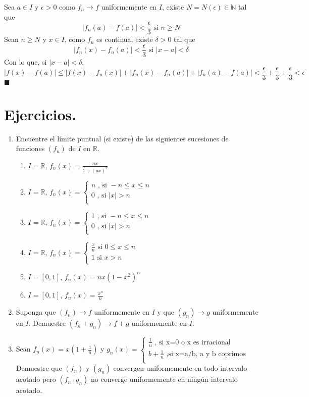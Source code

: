 \documentclass[12pt]{book}
\newcommand\R{{\mathbb R}}
\newcommand\N{{\mathbb N}}
\providecommand{\abs}[1]{\lvert#1\rvert}
\begin{document}
Sea $a \in I$ y $\epsilon>0$ como $f_n \rightarrow f$ uniformemente en $I$, existe $N=N(\epsilon) \in \N$ tal que $$\abs{f_n(a)-f(a)}<\frac{\epsilon}{3} \mbox{ si  }n \ge N$$
Sean $n \ge N$ y $x \in I$, como $f_n$ es continua, existe $\delta>0$ tal que $$\abs{f_n(x)-f_n(a)}<\frac{\epsilon}{3} \mbox{ si  }\abs{x-a}<\delta$$
Con lo que, si $\abs{x-a}< \delta$, $$\abs{f(x)-f(a)} \le \abs{f(x)-f_n(x)}+\abs{f_n(x)-f_n(a)}+\abs{f_n(a)-f(a)}<\frac{\epsilon}{3}+\frac{\epsilon}{3}+\frac{\epsilon}{3}<\epsilon$$ $\blacksquare$
\clearpage
\section{Ejercicios.}
\begin{enumerate}
    \item Encuentre el límite puntual (si existe) de las siguientes sucesiones de funciones $(f_n)$ de $I$ en $\R$.
    \begin{enumerate}
        \item $I=\R$, $f_n(x)=\frac{nx}{1+(nx)^2}$
        \item$I=\R$, $f_n(x)=\left\{ \begin{array}{lcc}
             n \mbox{ , si } -n \le x \le n
             \\0 \mbox{ , si } \abs{x}>n \\
             \end{array}
             \right.$
        \item$I=\R$, $f_n(x)=\left\{ \begin{array}{lcc}
             1 \mbox{ , si } -n \le x \le n
             \\0 \mbox{ , si } \abs{x}>n \\
             \end{array}
             \right.$
        \item$I=\R$, $f_n(x)=\left\{ \begin{array}{lcc}
             \frac{x}{n} \mbox{ si } 0 \le x \le n
             \\1 \mbox{ si } x>n \\
             \end{array}
             \right.$
        \item $I=[0,1]$, $f_n(x)=nx(1-x^2)^n$
        \item $I=[0,1]$, $f_n(x)=\frac{x^n}{n}$
    \end{enumerate}
    \item Suponga que $(f_n) \rightarrow f$ uniformemente en $I$ y que $(g_n) \rightarrow g$ uniformemente en $I$. Demuestre $(f_n+g_n) \rightarrow f+g$ uniformemente en $I$.
    \item Sean $f_n(x)=x(1+\frac{1}{n})$ y $g_n(x)=\left\{ \begin{array}{lcc}
             \frac{1}{n} \mbox{ , si x=0 o x es irracional }
             \\b+\frac{1}{n} \mbox{ ,si x=a/b, a y b coprimos }  \\
             \end{array}
             \right.$
             Demuestre que $(f_n)$ y $(g_n)$ convergen uniformemente en todo intervalo acotado pero $(f_n \cdot g_n)$ no converge uniformemente en ningún intervalo acotado.
\end{enumerate}
\end{document}
